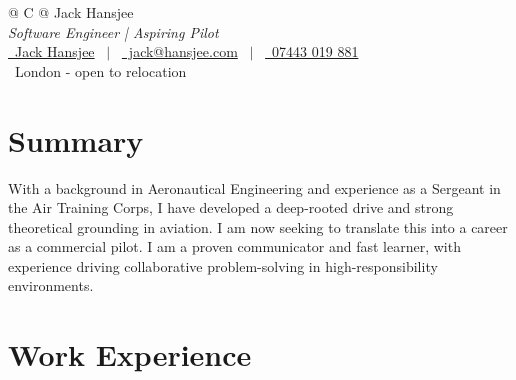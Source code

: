 \documentclass[a4paper,12pt]{article}
\begin{document}
\pagestyle{empty}


\begin{tabularx}{\linewidth}{@{} C @{}}
	\Huge{Jack Hansjee}                                                          \\[7.5pt]
	\large{\textit{Software Engineer | Aspiring Pilot}} \vspace{2mm}             \\
	\href{https://linkedin.com/in/jack-hansjee-79478b16b}{\raisebox{-0.05\height}\faLinkedin\ Jack Hansjee} \ $|$ \
	\href{mailto:jack@hansjee.com}{\raisebox{-0.05\height}\faEnvelope \ jack@hansjee.com} \ $|$ \
	\href{tel:+44744301988}{\raisebox{-0.05\height}\faMobile \ 07443 019 881}    \\
	\vspace*{-2mm}
	\textcolor{linkcolour}{\raisebox{-0.05\height}{\faMapMarker*}\ London - open to relocation} \\
\end{tabularx}


\section{Summary}
With a background in Aeronautical Engineering and experience as a Sergeant in the Air Training Corps, I have developed a deep-rooted drive and strong theoretical grounding in aviation. I am now seeking to translate this into a career as a commercial pilot. I am a proven communicator and fast learner, with experience driving collaborative problem-solving in high-responsibility environments.



\section{Work Experience}
\end{document}
